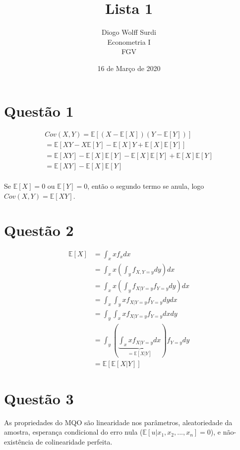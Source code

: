 \documentclass[12pt]{article}
\title{Lista 1} %
\author{Diogo Wolff Surdi\\ %
Econometria I\\ %
\textsc{FGV}
}
\date{16 de Março de 2020}
\begin{document}
   
\maketitle

\section*{Questão 1}

\begin{equation*}
    \begin{gathered}
        Cov(X,Y)=\mathbb{E}[(X-\mathbb{E}[X])(Y-\mathbb{E}[Y])]\\
        =\mathbb{E}[XY-X\mathbb{E}[Y]-\mathbb{E}[X]Y+\mathbb{E}[X]\mathbb{E}[Y]]\\
        =\mathbb{E}[XY]-\mathbb{E}[X]\mathbb{E}[Y]-\mathbb{E}[X]\mathbb{E}[Y]+\mathbb{E}[X]\mathbb{E}[Y]\\
        =\mathbb{E}[XY]-\mathbb{E}[X]\mathbb{E}[Y]
    \end{gathered}
\end{equation*}\\
Se $\mathbb{E}[X]=0$ ou $\mathbb{E}[Y]=0$, então o segundo termo se anula, logo $Cov(X,Y)=\mathbb{E}[XY]$.

\section*{Questão 2}

\begin{align*}
    \mathbb{E}[X]&=\int_x xf_xdx\\
    &=\int_x x\left(\int_y f_{X,Y=y}dy \right) dx\\
    &=\int_x x\left(\int_y f_{X|Y=y}f_{Y=y}dy\right)dx\\
    &=\int_x \int_y xf_{X|Y=y}f_{Y=y}dydx\\
    &=\int_y \int_x xf_{X|Y=y}f_{Y=y}dxdy\\
    &=\int_y\left(\underbrace{\int_x xf_{X|Y=y}dx}_{=\mathbb{E}[X|Y]}\right)f_{Y=y}dy\\
    &=\mathbb{E}[\mathbb{E}[X|Y]]
\end{align*}

\section*{Questão 3}
As propriedades do MQO são linearidade nos parâmetros, aleatoriedade da amostra, esperança condicional do erro nula ($\mathbb{E}[u|x_1,x_2,...,x_n]=0$), e não-existência de colinearidade perfeita.
\end{document}
